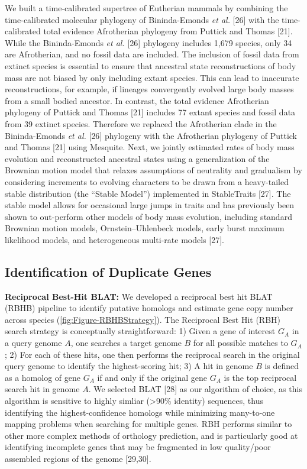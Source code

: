\documentclass[]{elsarticle} %
\begin{document}
We built a time-calibrated supertree of Eutherian mammals by combining the time-calibrated molecular phylogeny of Bininda-Emonds \emph{et al.} {[}26{]} with the time-calibrated total evidence Afrotherian phylogeny from Puttick and Thomas {[}21{]}. While the Bininda-Emonds \emph{et al.} {[}26{]} phylogeny includes 1,679 species, only 34 are Afrotherian, and no fossil data are included. The inclusion of fossil data from extinct species is essential to ensure that ancestral state reconstructions of body mass are not biased by only including extant species. This can lead to inaccurate reconstructions, for example, if lineages convergently evolved large body masses from a small bodied ancestor. In contrast, the total evidence Afrotherian phylogeny of Puttick and Thomas {[}21{]} includes 77 extant species and fossil data from 39 extinct species. Therefore we replaced the Afrotherian clade in the Bininda-Emonds \emph{et al.} {[}26{]} phylogeny with the Afrotherian phylogeny of Puttick and Thomas {[}21{]} using Mesquite. Next, we jointly estimated rates of body mass evolution and reconstructed ancestral states using a generalization of the Brownian motion model that relaxes assumptions of neutrality and gradualism by considering increments to evolving characters to be drawn from a heavy-tailed stable distribution (the ``Stable Model'') implemented in StableTraits {[}27{]}. The stable model allows for occasional large jumps in traits and has previously been shown to out-perform other models of body mass evolution, including standard Brownian motion models, Ornstein--Uhlenbeck models, early burst maximum likelihood models, and heterogeneous multi-rate models {[}27{]}.

\hypertarget{identification-of-duplicate-genes}{%
\subsection{Identification of Duplicate Genes}\label{identification-of-duplicate-genes}}

\textbf{Reciprocal Best-Hit BLAT:} We developed a reciprocal best hit BLAT (RBHB) pipeline to identify putative homologs and estimate gene copy number across species (\ref{fig:Figure-RBHBStrategy}). The Reciprocal Best Hit (RBH) search strategy is conceptually straightforward: 1) Given a gene of interest \(G_A\) in a query genome \(A\), one searches a target genome \(B\) for all possible matches to \(G_A\); 2) For each of these hits, one then performs the reciprocal search in the original query genome to identify the highest-scoring hit; 3) A hit in genome \(B\) is defined as a homolog of gene \(G_A\) if and only if the original gene \(G_A\) is the top reciprocal search hit in genome \(A\). We selected BLAT {[}28{]} as our algorithm of choice, as this algorithm is sensitive to highly simliar (\textgreater{}90\% identity) sequences, thus identifying the highest-confidence homologs while minimizing many-to-one mapping problems when searching for multiple genes. RBH performs similar to other more complex methods of orthology prediction, and is particularly good at identifying incomplete genes that may be fragmented in low quality/poor assembled regions of the genome {[}29,30{]}.
\end{document}
